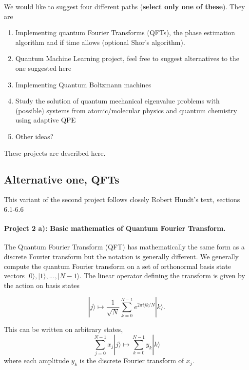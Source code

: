 \documentclass[%
oneside,                 %
final,                   %
10pt]{article}
\begin{document}
We would like to suggest four different paths (\textbf{select only one of these}). They are

\begin{enumerate}
\item Implementing quantum Fourier Transforms (QFTs), the phase estimation algorithm and if time allows (optional Shor's algorithm).

\item Quantum Machine Learning project, feel free to suggest alternatives to the one suggested here

\item Implementing Quantum Boltzmann machines

\item Study the solution of quantum mechanical eigenvalue problems with (possible) systems from atomic/molecular physics and quantum chemistry using adaptive QPE

\item Other ideas?  
\end{enumerate}

\noindent
These projects are described here.

\subsection*{Alternative one, QFTs}

This variant of the second project follows closely Robert Hundt's text, sections 6.1-6.6

\paragraph{Project 2 a): Basic mathematics of  Quantum Fourier Transform.}
The Quantum Fourier Transform (QFT) has mathematically the same form as a discrete Fourier transform
but the notation is generally different. We generally compute the
quantum Fourier transform on a set of orthonormal basis state vectors
\(|0\rangle, |1\rangle, ..., |N-1\rangle\). The linear operator defining
the transform is given by the action on basis states

\[
|j\rangle \mapsto \frac{1}{\sqrt{N}} \sum_{k=0}^{N-1} e^{2\pi ijk/N}|k\rangle.
\]

This can be written on arbitrary states,
\[
\sum_{j=0}^{N-1}x_j|j\rangle \mapsto \sum_{k=0}^{N-1} y_k|k\rangle
\]
where each amplitude \(y_k\) is the discrete Fourier transform of
\(x_j\).
\end{document}
